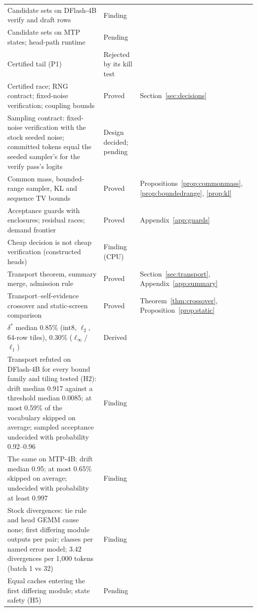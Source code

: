 {\begin{longtable}{@{}P{7.8cm}P{2.5cm}P{4.2cm}@{}}
Candidate sets on DFlash-4B verify and draft rows & Finding & \\
Candidate sets on MTP states; head-path runtime & Pending & \\
Certified tail (P1) & Rejected by its kill test & \\
Certified race; RNG contract; fixed-noise verification; coupling bounds & Proved & Section~\ref{sec:decisions}\\
Sampling contract: fixed-noise verification with the stock seeded noise; committed tokens equal the seeded sampler's for the verify pass's logits & Design decided; pending & \\
Common mass, bounded-range sampler, KL and sequence TV bounds & Proved & Propositions~\ref{prop:commonmass}, \ref{prop:boundedrange}, \ref{prop:kl}\\
Acceptance guards with enclosures; residual races; demand frontier & Proved & Appendix~\ref{app:guards}\\
Cheap decision is not cheap verification (constructed heads) & Finding (CPU) & \\
Transport theorem, summary merge, admission rule & Proved & Section~\ref{sec:transport}, Appendix~\ref{app:summary}\\
Transport--self-evidence crossover and static-screen comparison & Proved & Theorem~\ref{thm:crossover}, Proposition~\ref{prop:static}\\
$\delta^\ast$ median 0.85\% (int8, $\ell_2$, 64-row tiles), 0.30\% ($\ell_\infty$/$\ell_1$) & Derived & \\
Transport refuted on DFlash-4B for every bound family and tiling tested (H2): drift median 0.917 against a threshold median 0.0085; at most 0.59\% of the vocabulary skipped on average; sampled acceptance undecided with probability 0.92--0.96 & Finding & \\
The same on MTP-4B: drift median 0.95; at most 0.65\% skipped on average; undecided with probability at least 0.997 & Finding & \\
Stock divergences: tie rule and head GEMM cause none; first differing module outputs per pair; classes per named error model; 3.42 divergences per 1,000 tokens (batch 1 vs 32) & Finding & \\
Equal caches entering the first differing module; state safety (H5) & Pending & \\

\end{longtable}}

